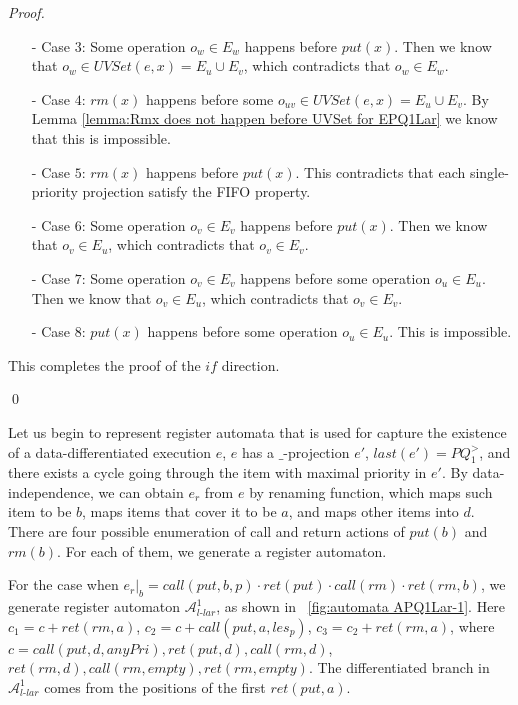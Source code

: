 \begin {proof}
\begin{itemize}
\item[-] Case $3$: Some operation $o_w \in E_w$ happens before $\textit{put}(x)$. Then we know that $o_w \in \textit{UVSet}(e,x) = E_u \cup E_v$, which contradicts that $o_w \in E_w$.

\item[-] Case $4$: $\textit{rm}(x)$ happens before some $o_{\textit{uv}} \in \textit{UVSet}(e,x) = E_u \cup E_v$. By Lemma \ref{lemma:Rmx does not happen before UVSet for EPQ1Lar} we know that this is impossible.

\item[-] Case $5$: $\textit{rm}(x)$ happens before $\textit{put}(x)$. This contradicts that each single-priority projection satisfy the FIFO property.

\item[-] Case $6$: Some operation $o_v \in E_v$ happens before $\textit{put}(x)$. Then we know that $o_v \in E_u$, which contradicts that $o_v \in E_v$.

\item[-] Case $7$: Some operation $o_v \in E_v$ happens before some operation $o_u \in E_u$. Then we know that $o_v \in E_u$, which contradicts that $o_v \in E_v$.

\item[-] Case $8$: $\textit{put}(x)$ happens before some operation $o_u \in E_u$. This is impossible.
\end{itemize}

This completes the proof of the $\textit{if}$ direction.

\qed
\end {proof}


Let us begin to represent register automata that is used for capture the existence of a data-differentiated execution $e$, $e$ has a $\_$-projection $e'$, $\textit{last}(e') = \textit{PQ}_1^{>}$, and there exists a cycle going through the item with maximal priority in $e'$. By data-independence, we can obtain $e_r$ from $e$ by renaming function, which maps such item to be $b$, maps items that cover it to be $a$, and maps other items into $d$. There are four possible enumeration of call and return actions of $\textit{put}(b)$ and $\textit{rm}(b)$. For each of them, we generate a register automaton.

For the case when $e_r \vert_{b} = \textit{call}(\textit{put},b,p) \cdot \textit{ret}(\textit{put}) \cdot \textit{call}(\textit{rm}) \cdot \textit{ret}(\textit{rm},b)$, we generate register automaton $\mathcal{A}_{\textit{l-lar}}^1$, as shown in \figurename~\ref{fig:automata APQ1Lar-1}. Here $c_1 = c + \textit{ret}(\textit{rm},a)$, $c_2 = c + \textit{call}(\textit{put},a,\textit{les}_p)$, $c_3 = c_2 + \textit{ret}(\textit{rm},a)$, where $c = \textit{call}(\textit{put},d,\textit{anyPri}),\textit{ret}(\textit{put},d), \textit{call}(\textit{rm},d)$, $\textit{ret}(\textit{rm},d),\textit{call}(\textit{rm},\textit{empty}),\textit{ret}(\textit{rm},\textit{empty})$. The differentiated branch in $\mathcal{A}_{\textit{l-lar}}^1$ comes from the positions of the first $\textit{ret}(\textit{put},a)$.

